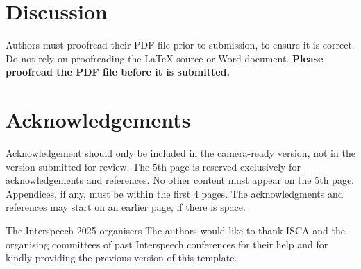 \documentclass{Interspeech}
\begin{document}
\section{Discussion}

Authors must proofread their PDF file prior to submission, to ensure it is correct. Do not rely on proofreading the \LaTeX\xspace source or Word document. \textbf{Please proofread the PDF file before it is submitted.}

\section{Acknowledgements}
Acknowledgement should only be included in the camera-ready version, not in the version submitted for review. The 5th page is reserved exclusively for acknowledgements and  references. No other content must appear on the 5th page. Appendices, if any, must be within the first 4 pages. The acknowledgments and references may start on an earlier page, if there is space.

\ifinterspeechfinal
     The Interspeech 2025 organisers
\else
     The authors
\fi
would like to thank ISCA and the organising committees of past Interspeech conferences for their help and for kindly providing the previous version of this template.




\end{document}
